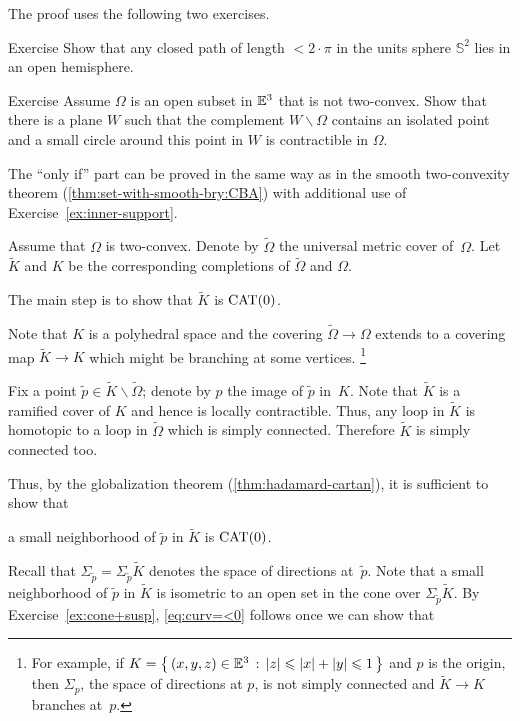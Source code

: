 The proof uses the following two exercises.

\begin{thm}{Exercise}\label{ex:hemisphere}
Show that any closed path of length $<2\cdot \pi$  in the units sphere $\mathbb{S}^2$ lies in an open  hemisphere. 
\end{thm}

\begin{thm}{Exercise}\label{ex:inner-support}
Assume $\Omega$ is an open subset in $\mathbb{E}^3$
that is not two-convex.
Show that there is a plane $W$ such that the complement 
$W\backslash \Omega$ contains an isolated point and a small circle around this point in $W$ is contractible in $\Omega$.
\end{thm}

The ``only if'' part can be proved in the same way as in the smooth two-convexity theorem (\ref{thm:set-with-smooth-bry:CBA}) with additional use of Exercise~\ref{ex:inner-support}.


Assume that $\Omega$ is two-convex.
Denote by $\tilde\Omega$ the universal metric cover of~$\Omega$.
Let $\tilde K$ and $K$ be the corresponding completions of $\tilde\Omega$ and  $\Omega$.

The main step is to show that $\tilde K$ is $\mathrm{CAT}(0)$. 

Note that $K$ is a polyhedral space and the covering $\tilde\Omega\to\Omega$ extends to a covering map $\tilde K\to K$ which might be branching at some vertices.%
\footnote{For example, if $K=\left\{\,{(x,y,z)\in\mathbb{E}^3}\,:\,{|z|\leqslant |x|+|y|\leqslant 1}\,\right\}$ and $p$ is the origin, then $\Sigma_p$,
the space of directions at $p$,
is not simply connected and $\tilde K\to K$ branches at~$p$.}

Fix a point $\tilde p\in \tilde K\backslash\tilde\Omega$; 
denote by $p$ the image of $\tilde p$ in~$K$.
Note that  $\tilde K$ is a ramified cover of $K$ and hence is locally contractible. Thus, any loop in $\tilde K$ is homotopic to a loop in $\tilde\Omega$ which is simply connected.
Therefore $\tilde K$ is simply connected too.

Thus, by the globalization theorem (\ref{thm:hadamard-cartan}), it is sufficient to show that

\begin{clm}{}\label{eq:curv=<0}
a small neighborhood of $\tilde p$ in $\tilde K$ is $\mathrm{CAT}(0)$.
\end{clm}

Recall that $\Sigma_{\tilde p}=\Sigma_{\tilde p}\tilde K$ denotes the space of directions at~$\tilde p$.
Note that a small neighborhood of $\tilde p$ in $\tilde K$
is isometric to an open set in the cone over $\Sigma_{\tilde p}\tilde K$.
By Exercise~\ref{ex:cone+susp}, \ref{eq:curv=<0} follows once we can show that


